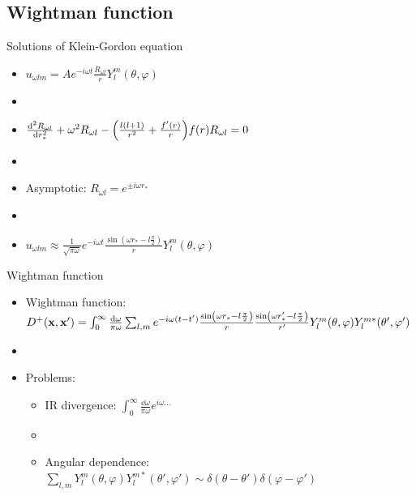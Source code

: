 \documentclass{beamer}
\begin{document}
\subsection{Wightman function}
\begin{frame}{Solutions of Klein-Gordon equation}
\begin{itemize}
	\item \(u_{\omega l m} = A e^{-i\omega t} \frac{R_{\omega l}}{r}Y_l^m (\theta, \varphi)\)
	\item[]
	\item \(\dv[2]{R_{\omega l}}{r_*} + \omega^2 R_{\omega l} -\qty(\frac{l(l+1)}{r^2} + \frac{f'(r)}{r})f(r) R_{\omega l} = 0\)
	\item[]
	\item Asymptotic: \(R_{\omega l} = e^{\pm i\omega r_*}\)
	\item[]	
	\item \(u_{\omega l m} \approx \frac{1}{\sqrt{\pi\omega}} e^{-i\omega t} \frac{\sin(\omega r_* - l\frac{\pi}{2})}{r} Y_l^m (\theta, \varphi)\) 
\end{itemize}
\end{frame}

\begin{frame}{Wightman function}
\begin{itemize}
	\item Wightman function: \(D^+(\vb{x}, \vb{x}') = \int_0^\infty \frac{\dd{\omega}}{\pi\omega} \sum_{l,m} e^{-i\omega(t-t')} \frac{\sin(\omega r_* - l\frac{\pi}{2})}{r} \frac{\sin(\omega r_*' - l\frac{\pi}{2})}{r'} Y_l^m(\theta,\varphi) Y_l^{m*}(\theta',\varphi')\)
	\item[]
	\item Problems:
		\begin{itemize}
			\item IR divergence: \(\int_0^\infty \frac{\dd{\omega}}{\pi\omega} e^{i\omega\dots}\)
			\item[]
			\item Angular dependence: \(\sum_{l,m} Y_l^m(\theta,\varphi) Y_l^{m*}(\theta',\varphi') \sim \delta(\theta-\theta')\delta(\varphi-\varphi')\)
		\end{itemize}
\end{itemize}
\end{frame}
\end{document}

